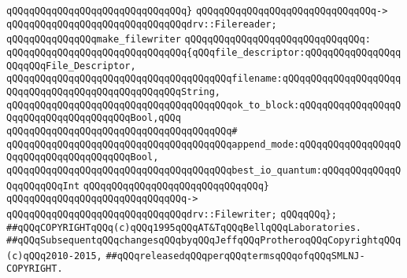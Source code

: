 \verb|qQQqqQQqqQQqqQQqqQQqqQQqqQQqqQQq}|\newline
\verb|qQQqqQQqqQQqqQQqqQQqqQQqqQQqqQQq->|\newline
\verb|qQQqqQQqqQQqqQQqqQQqqQQqqQQqqQQqdrv::Filereader;|\newline
\newline
\verb|qQQqqQQqqQQqqQQqmake_filewriter|\newline
\verb|qQQqqQQqqQQqqQQqqQQqqQQqqQQqqQQq:|\newline
\verb|qQQqqQQqqQQqqQQqqQQqqQQqqQQqqQQq{qQQqfile_descriptor:qQQqqQQqqQQqqQQqqQQqqQQqFile_Descriptor,|\newline
\verb|qQQqqQQqqQQqqQQqqQQqqQQqqQQqqQQqqQQqqQQqfilename:qQQqqQQqqQQqqQQqqQQqqQQqqQQqqQQqqQQqqQQqqQQqqQQqqQQqString,|\newline
\verb|qQQqqQQqqQQqqQQqqQQqqQQqqQQqqQQqqQQqqQQqok_to_block:qQQqqQQqqQQqqQQqqQQqqQQqqQQqqQQqqQQqqQQqBool,qQQq|\newline
\verb|qQQqqQQqqQQqqQQqqQQqqQQqqQQqqQQqqQQqqQQq#|\newline
\verb|qQQqqQQqqQQqqQQqqQQqqQQqqQQqqQQqqQQqqQQqappend_mode:qQQqqQQqqQQqqQQqqQQqqQQqqQQqqQQqqQQqqQQqBool,|\newline
\verb|qQQqqQQqqQQqqQQqqQQqqQQqqQQqqQQqqQQqqQQqbest_io_quantum:qQQqqQQqqQQqqQQqqQQqqQQqInt|\newline
\verb|qQQqqQQqqQQqqQQqqQQqqQQqqQQqqQQq}|\newline
\verb|qQQqqQQqqQQqqQQqqQQqqQQqqQQqqQQq->|\newline
\verb|qQQqqQQqqQQqqQQqqQQqqQQqqQQqqQQqdrv::Filewriter;|\newline
\verb|qQQqqQQq};|\newline
\newline
\newline
\newline
\newline
\verb|##qQQqCOPYRIGHTqQQq(c)qQQq1995qQQqAT&TqQQqBellqQQqLaboratories.|\newline
\verb|##qQQqSubsequentqQQqchangesqQQqbyqQQqJeffqQQqProtheroqQQqCopyrightqQQq(c)qQQq2010-2015,|\newline
\verb|##qQQqreleasedqQQqperqQQqtermsqQQqofqQQqSMLNJ-COPYRIGHT.|\newline

